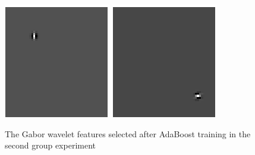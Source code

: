 \begin{figure}[ht]
\begin{center}
\includegraphics[width=\textwidth/9]{ch4/figures/Gabor7.png}
\includegraphics[width=\textwidth/9]{ch4/figures/Gabor8.png}\\
\caption{The Gabor wavelet features selected after AdaBoost training in the second group experiment}
\label{fig:resultlarge}
\end{center}
\end{figure}
